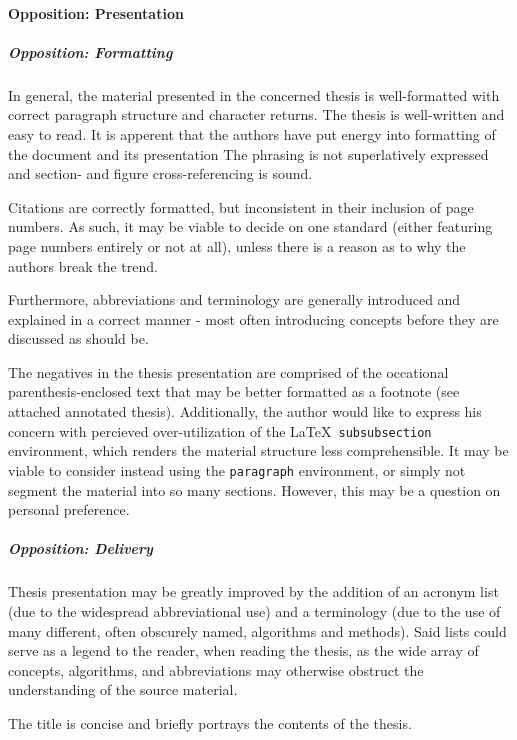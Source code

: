 
\paragraph{Opposition: Presentation}
\label{par:oppositionpresentation}

\subparagraph{Opposition: Formatting}
\label{par:oppositionformatting}
In general, the material presented in the concerned thesis is well-formatted with correct paragraph structure and character returns.
The thesis is well-written and easy to read.
It is apperent that the authors have put energy into formatting of the document and its presentation
The phrasing is not superlatively expressed and section- and figure cross-referencing is sound.

Citations are correctly formatted, but inconsistent in their inclusion of page numbers.
As such, it may be viable to decide on one standard (either featuring page numbers entirely or not at all), unless there is a reason as to why the authors break the trend.

Furthermore, abbreviations and terminology are generally introduced and explained in a correct manner - most often introducing concepts before they are discussed as should be.

The negatives in the thesis presentation are comprised of the occational parenthesis-enclosed text that may be better formatted as a footnote (see attached annotated thesis).
Additionally, the author would like to express his concern with percieved over-utilization of the \LaTeX\ \texttt{subsubsection} environment, which renders the material structure less comprehensible.
It may be viable to consider instead using the \texttt{paragraph} environment, or simply not segment the material into so many sections.
However, this may be a question on personal preference.

\subparagraph{Opposition: Delivery}
\label{par:oppositionpresentation_delivery}
Thesis presentation may be greatly improved by the addition of an acronym list (due to the widespread abbreviational use) and a terminology (due to the use of many different, often obscurely named, algorithms and methods).
Said lists could serve as a legend to the reader, when reading the thesis, as the wide array of concepts, algorithms, and abbreviations may otherwise obstruct the understanding of the source material.

The title is concise and briefly portrays the contents of the thesis.